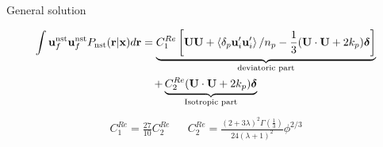 \documentclass{sintefbeamer}
\begin{document}
\begin{frame}
  {General solution}

  \begin{multline*}
    \int\textbf{u}^\text{nst}_f
    \textbf{u}^\text{nst}_f 
    P_\text{nst}(\textbf{r}|\textbf{x}) d\textbf{r} 
    = 
    \underbrace{C_1^{Re} \left[
        \textbf{U}\textbf{U}
        + \left<\delta_p \textbf{u}_i'\textbf{u}_i'\right>/n_p
         - \frac{1}{3}(
          \textbf{U}\cdot \textbf{U}
         +2k_p
         )\bm\delta
    \right]}_\text{deviatoric part}\\
    + 
    \underbrace{ C_2^{Re}  (\textbf{U}\cdot \textbf{U}
    +2k_p
    )\bm\delta}_\text{Isotropic part}
\end{multline*}
\begin{align*}
  C_1^{Re} =
  \frac{27}{10}
  C_2^{Re}
  &&  C_2^{Re} = \frac{(2+3\lambda)^2 \Gamma(\frac{1}{3})}{24(\lambda+1)^2}\phi^{2/3} 
\end{align*}

\end{frame}
\end{document}
